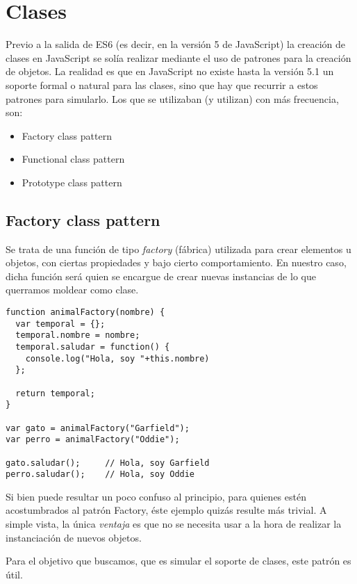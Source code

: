 \section{Clases}
\label{clases}

Previo a la salida de ES6 (es decir, en la versión 5 de JavaScript) la creación de clases en JavaScript se solía realizar mediante el uso de patrones para la creación de objetos. La realidad es que en JavaScript no existe hasta la versión 5.1 un soporte formal o natural para las clases, sino que hay que recurrir a estos patrones para simularlo. Los que se utilizaban (y utilizan) con más frecuencia, son:

\begin{itemize}
	\item Factory class pattern
	\item Functional class pattern
	\item Prototype class pattern
\end{itemize}

\subsection{Factory class pattern}

Se trata de una función de tipo \textit{factory} (fábrica) utilizada para crear elementos u objetos, con ciertas propiedades y bajo cierto comportamiento. En nuestro caso, dicha función será quien se encargue de crear nuevas instancias de lo que querramos moldear como clase.

\begin{lstlisting}[title={Factory class pattern}]
function animalFactory(nombre) {
  var temporal = {};
  temporal.nombre = nombre;
  temporal.saludar = function() {
    console.log("Hola, soy "+this.nombre)
  };

  return temporal;
}

var gato = animalFactory("Garfield");
var perro = animalFactory("Oddie");

gato.saludar();		// Hola, soy Garfield
perro.saludar();	// Hola, soy Oddie
\end{lstlisting}

Si bien puede resultar un poco confuso al principio, para quienes estén acostumbrados al patrón Factory, éste ejemplo quizás resulte más trivial. A simple vista, la única \textit{ventaja} es que no se necesita usar  a la hora de realizar la instanciación de nuevos objetos. 

Para el objetivo que buscamos, que es simular el soporte de clases, este patrón es útil.

